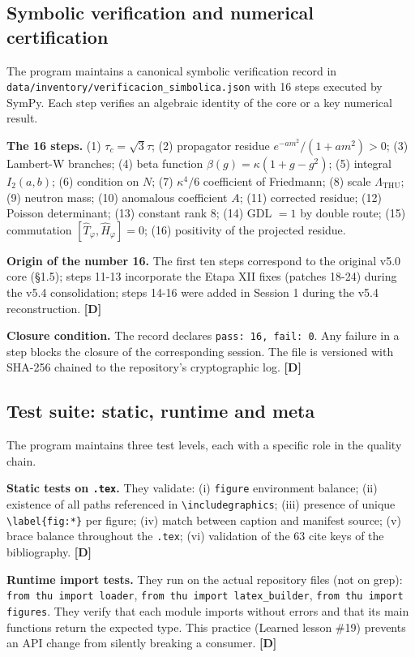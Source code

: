 ﻿\documentclass[11pt,letterpaper]{article}
\begin{document}
\subsection{Symbolic verification and numerical certification}
The program maintains a canonical symbolic verification record in \texttt{data/inventory/verificacion\_simbolica.json} with 16 steps executed by SymPy. Each step verifies an algebraic identity of the core or a key numerical result.

\textbf{The 16 steps.} (1) $\tau_c = \sqrt{3}\tau$; (2) propagator residue $e^{-am^2}/(1+am^2) > 0$; (3) Lambert-W branches; (4) beta function $\beta(g) = \kappa(1+g-g^2)$; (5) integral $I_2(a,b)$; (6) condition on $N$; (7) $\kappa^4/6$ coefficient of Friedmann; (8) scale $\Lambda_{\mathrm{THU}}$; (9) neutron mass; (10) anomalous coefficient $A$; (11) corrected residue; (12) Poisson determinant; (13) constant rank 8; (14) GDL $= 1$ by double route; (15) commutation $[\hat{T}_\varphi, \hat{H}_\varphi] = 0$; (16) positivity of the projected residue.

\textbf{Origin of the number 16.} The first ten steps correspond to the original v5.0 core (§1.5); steps 11-13 incorporate the Etapa XII fixes (patches 18-24) during the v5.4 consolidation; steps 14-16 were added in Session 1 during the v5.4 reconstruction. \textbf{[D]}

\textbf{Closure condition.} The record declares \texttt{pass: 16, fail: 0}. Any failure in a step blocks the closure of the corresponding session. The file is versioned with SHA-256 chained to the repository's cryptographic log. \textbf{[D]}
\subsection{Test suite: static, runtime and meta}
The program maintains three test levels, each with a specific role in the quality chain.

\textbf{Static tests on \texttt{.tex}.} They validate: (i) \texttt{figure} environment balance; (ii) existence of all paths referenced in \texttt{\textbackslash includegraphics}; (iii) presence of unique \texttt{\textbackslash label\{fig:*\}} per figure; (iv) match between caption and manifest source; (v) brace balance throughout the \texttt{.tex}; (vi) validation of the 63 cite keys of the bibliography. \textbf{[D]}

\textbf{Runtime import tests.} They run on the actual repository files (not on grep): \texttt{from thu import loader}, \texttt{from thu import latex\_builder}, \texttt{from thu import figures}. They verify that each module imports without errors and that its main functions return the expected type. This practice (Learned lesson \#19) prevents an API change from silently breaking a consumer. \textbf{[D]}
\end{document}
